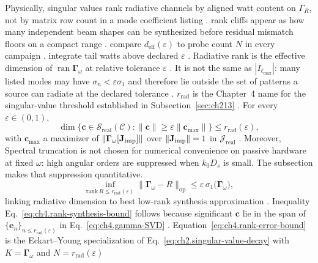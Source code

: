 Physically, singular values rank radiative channels by aligned watt content on $\Gamma_R$, not by matrix row count in a mode coefficient listing \cite{harrington2001}. rank cliffs appear as how many independent beam shapes can be synthesized before residual mismatch floors on a compact range \cite{devaney2004}. compare $d_{\mathrm{eff}}(\varepsilon)$ to probe count $N$ in every campaign \cite{harrington2001}. integrate tail watts above declared $\varepsilon$ \cite{poynting1884}.
Radiative rank is the effective dimension of \(\operatorname{ran}\boldsymbol{\Gamma}_\omega\) at relative tolerance
\(\varepsilon\) \cite{harrington2001}. It is not the same as \(|I_{\ell_{\max}}|\): many listed modes may
have \(\sigma_{n}<\varepsilon\sigma_{1}\) and therefore lie outside the set of patterns a source can radiate at the declared tolerance
\cite{hansen1988}. \(r_{\mathrm{rad}}\) is the Chapter~4 name for the singular-value threshold
established in Subsection~\ref{sec:ch213} \cite{stratton1941}.
\label{thm:ch4.radiative-rank}
For every \(\varepsilon\in(0,1)\),
\begin{equation}
\label{eq:ch4.rank-synthesis-bound}
\dim\Big\{\mathbf{c}\in\mathcal{S}_{\mathrm{real}}(\mathcal{C}):
\|\mathbf{c}\|\ge\varepsilon\|\mathbf{c}_{\max}\|\Big\}
\le
r_{\mathrm{rad}}(\varepsilon),
\end{equation}
with \(\mathbf{c}_{\max}\) a maximizer of \(\|\boldsymbol{\Gamma}_\omega[\mathbf{J}_{\mathrm{imp}}]\|\) over \(\|\mathbf{J}_{\mathrm{imp}}\|=1\) in
\(\mathcal{J}_{\mathrm{real}}\) \cite{stratton1941}. Moreover,
Spectral truncation is not chosen for numerical convenience on passive hardware at fixed $\omega$: high angular orders are suppressed when $k_0 D_s$ is small. The subsection makes that suppression quantitative. \cite{stratton1941}
\begin{equation}
\label{eq:ch4.rank-error-bound}
\inf_{\mathrm{rank}\,R\le r_{\mathrm{rad}}(\varepsilon)}\|
\boldsymbol{\Gamma}_\omega-R\|_{\mathrm{op}}
\le
\varepsilon\,\sigma_{1}\big(\boldsymbol{\Gamma}_\omega\big),
\end{equation}
linking radiative dimension to best low-rank synthesis approximation \cite{devaney2004}.
Inequality Eq.~\eqref{eq:ch4.rank-synthesis-bound} follows because significant \(\mathbf{c}\) lie in the span of
\(\{\mathbf{e}_{n}\}_{n\le r_{\mathrm{rad}}(\varepsilon)}\) in Eq.~\eqref{eq:ch4.gamma-SVD}
\cite{stratton1941}. Equation~\eqref{eq:ch4.rank-error-bound} is the Eckart--Young specialization of
Eq.~\eqref{eq:ch2.singular-value-decay} with \(K=\boldsymbol{\Gamma}_\omega\) and \(N=r_{\mathrm{rad}}(\varepsilon)\)

